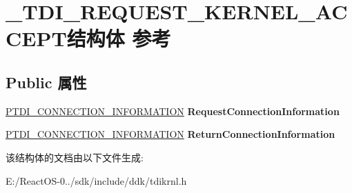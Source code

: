 \hypertarget{struct___t_d_i___r_e_q_u_e_s_t___k_e_r_n_e_l___a_c_c_e_p_t}{}\section{\+\_\+\+T\+D\+I\+\_\+\+R\+E\+Q\+U\+E\+S\+T\+\_\+\+K\+E\+R\+N\+E\+L\+\_\+\+A\+C\+C\+E\+P\+T结构体 参考}
\label{struct___t_d_i___r_e_q_u_e_s_t___k_e_r_n_e_l___a_c_c_e_p_t}
\subsection*{Public 属性}
\begin{DoxyCompactItemize}
\item 
\mbox{\label{struct___t_d_i___r_e_q_u_e_s_t___k_e_r_n_e_l___a_c_c_e_p_t_a85305aa885553616eb504fb20d3df656}} 
\hyperlink{struct___t_d_i___c_o_n_n_e_c_t_i_o_n___i_n_f_o_r_m_a_t_i_o_n}{P\+T\+D\+I\+\_\+\+C\+O\+N\+N\+E\+C\+T\+I\+O\+N\+\_\+\+I\+N\+F\+O\+R\+M\+A\+T\+I\+ON} {\bfseries Request\+Connection\+Information}
\item 
\mbox{\label{struct___t_d_i___r_e_q_u_e_s_t___k_e_r_n_e_l___a_c_c_e_p_t_aec379f7b7a71cb64892797fbdeed71f0}} 
\hyperlink{struct___t_d_i___c_o_n_n_e_c_t_i_o_n___i_n_f_o_r_m_a_t_i_o_n}{P\+T\+D\+I\+\_\+\+C\+O\+N\+N\+E\+C\+T\+I\+O\+N\+\_\+\+I\+N\+F\+O\+R\+M\+A\+T\+I\+ON} {\bfseries Return\+Connection\+Information}
\end{DoxyCompactItemize}


该结构体的文档由以下文件生成\+:\begin{DoxyCompactItemize}
\item 
E\+:/\+React\+O\+S-\/0../sdk/include/ddk/tdikrnl.\+h\end{DoxyCompactItemize}
